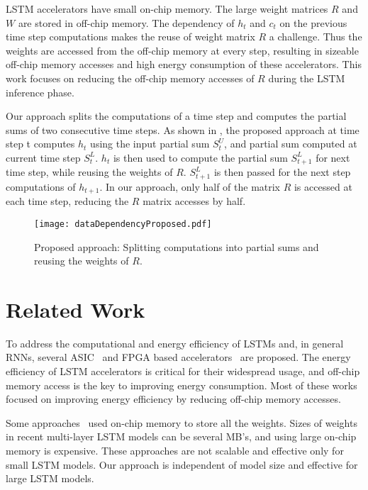 LSTM accelerators have small on-chip memory. The large weight matrices $R$ and $W$ are stored in off-chip memory. The dependency of $h_{t}$ and $c_{t}$ on the previous time step computations makes the reuse of weight matrix $R$ a challenge. Thus the weights are accessed from the off-chip memory at every step, resulting in sizeable off-chip memory accesses and high energy consumption of these accelerators. This work focuses on reducing the off-chip memory accesses of $R$ during the LSTM inference phase. 

Our approach splits the computations of a time step and computes the partial sums of two consecutive time steps. As shown in , the proposed approach at time step t computes $h_t$ using the input partial sum $S^U_t$, and partial sum computed at current time step $S^L_t$. $h_t$ is then used to compute the partial sum $S^L_{t{+}1}$ for next time step, while reusing the weights of $R$. $S^L_{t{+}1}$ is then passed for the next step computations of $h_{t{+}1}$. In our approach, only half of the matrix $R$ is accessed at each time step, reducing the $R$ matrix accesses by half.
\begin{figure}[!htb]
	\centerline{\texttt{[image: dataDependencyProposed.pdf]}}
	\caption{Proposed approach: Splitting computations into partial sums and reusing the weights of $R$.}
	\label{fig:dataDependencyProposed}
\end{figure}
\section{Related Work}
To address the computational and energy efficiency of LSTMs and, in general RNNs, several ASIC~\cite{conti2018chipmunk,wang2017accelerating,azari2020elsa} and FPGA based accelerators~\cite{chang2015recurrent,ferreira2016fpga,lee2016fpga,guan2017fpga,han2017ese} are proposed. The energy efficiency of LSTM accelerators is critical for their widespread usage, and off-chip memory access is the key to improving energy consumption. Most of these works focused on improving energy efficiency by reducing off-chip memory accesses.

Some approaches~\cite{lee2016fpga, rybalkin2018finn, ferreira2016fpga} used on-chip memory to store all the weights. Sizes of weights in recent multi-layer LSTM models can be several MB's, and using large on-chip memory is expensive. These approaches are not scalable and effective only for small LSTM models. Our approach is independent of model size and effective for large LSTM models.

